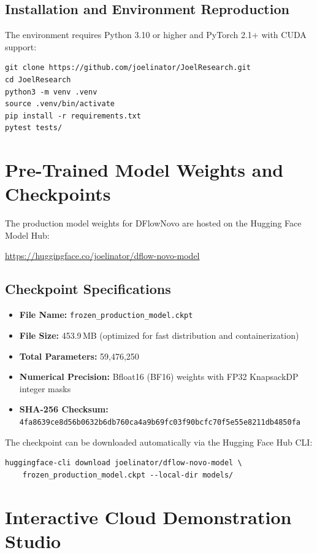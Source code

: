 \subsection{Installation and Environment Reproduction}

The environment requires Python 3.10 or higher and PyTorch 2.1+ with CUDA support:
\begin{verbatim}
git clone https://github.com/joelinator/JoelResearch.git
cd JoelResearch
python3 -m venv .venv
source .venv/bin/activate
pip install -r requirements.txt
pytest tests/
\end{verbatim}

\section{Pre-Trained Model Weights and Checkpoints}

The production model weights for DFlowNovo are hosted on the Hugging Face Model Hub:
\begin{center}
\url{https://huggingface.co/joelinator/dflow-novo-model}
\end{center}

\subsection{Checkpoint Specifications}
\begin{itemize}
    \item \textbf{File Name:} \texttt{frozen\_production\_model.ckpt}
    \item \textbf{File Size:} 453.9\,MB (optimized for fast distribution and containerization)
    \item \textbf{Total Parameters:} 59,476,250
    \item \textbf{Numerical Precision:} Bfloat16 (BF16) weights with FP32 KnapsackDP integer masks
    \item \textbf{SHA-256 Checksum:} \texttt{4fa8639ce8d56b0632b6db760ca4a9b69fc03f90bcfc70f5e55e8211db4850fa}
\end{itemize}

The checkpoint can be downloaded automatically via the Hugging Face Hub CLI:
\begin{verbatim}
huggingface-cli download joelinator/dflow-novo-model \
    frozen_production_model.ckpt --local-dir models/
\end{verbatim}

\section{Interactive Cloud Demonstration Studio}

